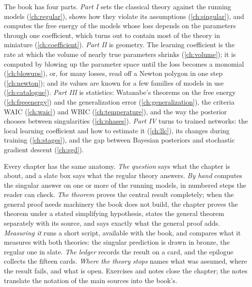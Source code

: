 \begin{refsection}
The book has four parts. \emph{Part I} sets the classical theory against the running models (\cref{ch:regular}), shows how they violate its assumptions (\cref{ch:singular}), and computes the free energy of the models whose loss depends on the parameters through one coefficient, which turns out to contain most of the theory in miniature (\cref{ch:coefficient}). \emph{Part II} is geometry. The learning coefficient is the rate at which the volume of nearly true parameters shrinks (\cref{ch:volume}); it is computed by blowing up the parameter space until the loss becomes a monomial (\cref{ch:blowups}), or, for many losses, read off a Newton polygon in one step (\cref{ch:newton}); and its values are known for a few families of models in use (\cref{ch:catalogue}). \emph{Part III} is statistics: Watanabe's theorems on the free energy (\cref{ch:freeenergy}) and the generalization error (\cref{ch:generalization}), the criteria WAIC (\cref{ch:waic}) and WBIC (\cref{ch:temperature}), and the way the posterior chooses between singularities (\cref{ch:phases}). \emph{Part IV} turns to trained networks: the local learning coefficient and how to estimate it (\cref{ch:llc}), its changes during training (\cref{ch:stages}), and the gap between Bayesian posteriors and stochastic gradient descent (\cref{ch:sgd}).

Every chapter has the same anatomy. \emph{The question} says what the chapter is about, and a slate box says what the regular theory answers. \emph{By hand} computes the singular answer on one or more of the running models, in numbered steps the reader can check. \emph{The theorem} proves the central result completely; when the general proof needs machinery the book does not build, the chapter proves the theorem under a stated simplifying hypothesis, states the general theorem separately with its source, and says exactly what the general proof adds. \emph{Measuring it} runs a short script, available with the book, and compares what it measures with both theories: the singular prediction is drawn in bronze, the regular one in slate. \emph{The ledger} records the result on a card, and the epilogue collects the fifteen cards. \emph{Where the theory stops} names what was assumed, where the result fails, and what is open. Exercises and notes close the chapter; the notes translate the notation of the main sources into the book's.


\end{refsection}
